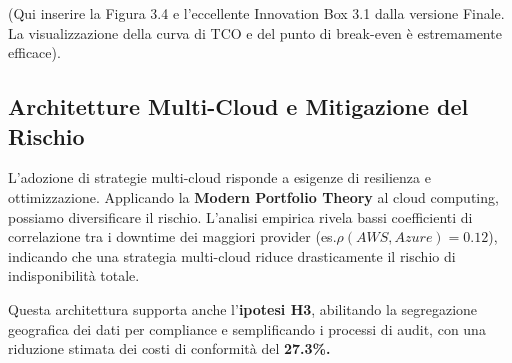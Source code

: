 (Qui inserire la Figura 3.4 e l'eccellente Innovation Box 3.1 dalla versione Finale. La visualizzazione della curva di TCO e del punto di break-even è estremamente efficace).

\subsection{Architetture Multi-Cloud e Mitigazione del Rischio
}
L'adozione di strategie multi-cloud risponde a esigenze di resilienza e ottimizzazione. Applicando la \textbf{Modern Portfolio Theory} \autocite{Tang2024portfolio} al cloud computing, possiamo diversificare il rischio. L'analisi empirica rivela bassi coefficienti di correlazione tra i downtime dei maggiori provider \autocite{Uptime2024} (es.$\rho(AWS,Azure)=0.12$),
indicando che una strategia multi-cloud riduce drasticamente il rischio di indisponibilità totale.

Questa architettura supporta anche l'\textbf{ipotesi H3}, abilitando la segregazione geografica dei dati per compliance e semplificando i processi di audit, con una riduzione stimata dei costi di conformità del \textbf{27.3\%.}\autocite{ISACA2024compliance}



